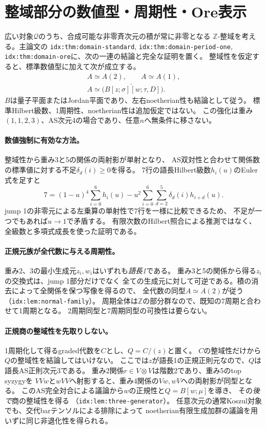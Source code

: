 \documentclass[11pt,a4paper]{ltjsarticle}
\begin{document}
\section{整域部分の数値型・周期性・Ore表示}
広い対象$\mathcal Q$のうち、合成可能な非零斉次元の積が常に非零となる
$\mathbb Z$-整域を考える。主論文の
\texttt{idx:thm:domain-standard}, \texttt{idx:thm:domain-period-one},
\texttt{idx:thm:domain-ore}に、次の一連の結論と完全な証明を置く。
整域性を仮定すると、標準数値型に加えて次が成立する。
\[
\begin{gathered}
A\simeq A(2),\qquad A\simeq A(1),\\
A\simeq\check{\bigl(B[z;\sigma][w;\tau,D]\bigr)}.
\end{gathered}
\]
$B$は量子平面またはJordan平面であり、左右noetherian性も結論として従う。
標準Hilbert級数、1周期性、noetherian性は追加仮定ではない。
この強化は重み$(1,1,2,3)$、AS次元4の場合であり、任意$n$へ無条件に移さない。

\paragraph{数値強制に有効な方法。}
整域性から重み3と5の関係の両射影が単射となり、
AS双対性と合わせて関係数の標準値に対する不足$\delta_d(i)\geq0$を得る。
7行の語長Hilbert級数$h_i(u)$のEuler式を足すと
\[
7=(1-u)^4\sum_{i=0}^{6}h_i(u)
-u^2\sum_{i=0}^{6}\sum_{d=2}^{5}\delta_d(i)h_{i+d}(u).
\]
jump 1の非零元による左乗算の単射性で7行を一様に比較できるため、
不足が一つでもあれば$u\to1$で矛盾する。
有限次数のHilbert照合による推測ではなく、全級数と多項式成長を使った証明である。

\paragraph{正規元族が全代数に与える周期性。}
重み2、3の最小生成元$z_i,w_i$はいずれも\emph{語長1}である。
重み3と5の関係から得る$z_i$の交換式は、jump 1部分だけでなく
全ての生成元に対して可逆である。積の消去によって全関係を保つ写像を得るので、
全代数の同型$A\simeq A(2)$が従う
（\texttt{idx:lem:normal-family}）。
周期全体は$\mathbb Z$の部分群なので、既知の7周期と合わせて1周期となる。
2周期同型と7周期同型の可換性は要らない。

\paragraph{正規商の整域性を先取りしない。}
1周期化して得るgraded代数を$C$とし、$Q=C/(z)$と置く。
$C$の整域性だけから$Q$の整域性を結論してはいけない。
ここでは$z$が語長1の正規正則元なので、$Q$は語長AS正則次元3である。
重み2関係$r\in V\otimes V$は階数2であり、重み5のtop syzygyを
$VVw$と$wVV$へ射影すると、重み4関係の$Vw,wV$への両射影が同型となる。
このAS完全対合による議論から$w$の正規性と$Q=B[w;\mu]$を導き、
その\emph{後で}商の整域性を得る
（\texttt{idx:lem:three-generator}）。
任意次元の通常Koszul対象でも、交代barテンソルによる排除によって
noetherian有限生成加群の議論を用いずに同じ非退化性を得られる。
\end{document}
